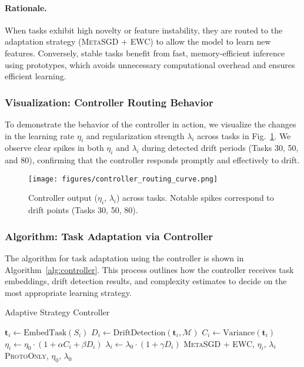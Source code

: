 \documentclass[conference]{IEEEtran}
\begin{document}
\paragraph{Rationale.}
When tasks exhibit high novelty or feature instability, they are routed to the adaptation strategy (\textsc{MetaSGD + EWC}) to allow the model to learn new features. Conversely, stable tasks benefit from fast, memory-efficient inference using prototypes, which avoids unnecessary computational overhead and ensures efficient learning.

\subsubsection*{Visualization: Controller Routing Behavior}

To demonstrate the behavior of the controller in action, we visualize the changes in the learning rate $\eta_i$ and regularization strength $\lambda_i$ across tasks in Fig.~\ref{fig:controller_curve}. We observe clear spikes in both $\eta_i$ and $\lambda_i$ during detected drift periods (Tasks 30, 50, and 80), confirming that the controller responds promptly and effectively to drift.

\begin{figure}[ht]
\centering
\texttt{[image: figures/controller\_routing\_curve.png]}
\caption{Controller output ($\eta_i$, $\lambda_i$) across tasks. Notable spikes correspond to drift points (Tasks 30, 50, 80).}
\label{fig:controller_curve}
\end{figure}

\subsubsection*{Algorithm: Task Adaptation via Controller}

The algorithm for task adaptation using the controller is shown in Algorithm~\ref{alg:controller}. This process outlines how the controller receives task embeddings, drift detection results, and complexity estimates to decide on the most appropriate learning strategy.

\begin{algorithm}[H]
\caption{Adaptive Strategy Controller}
\label{alg:controller}
\begin{algorithmic}[1]
    \State $\mathbf{t}_i \gets \text{EmbedTask}(S_i)$
    \State $D_i \gets \text{DriftDetection}(\mathbf{t}_i, \mathcal{M})$
    \State $C_i \gets \text{Variance}(\mathbf{t}_i)$
    \State $\eta_i \gets \eta_0 \cdot (1 + \alpha C_i + \beta D_i)$
    \State $\lambda_i \gets \lambda_0 \cdot (1 + \gamma D_i)$
        \State \Return \textsc{MetaSGD + EWC}, $\eta_i$, $\lambda_i$
    \Else
        \State \Return \textsc{ProtoOnly}, $\eta_0$, $\lambda_0$
    \EndIf
\EndProcedure
\end{algorithmic}
\end{algorithm}
\end{document}

